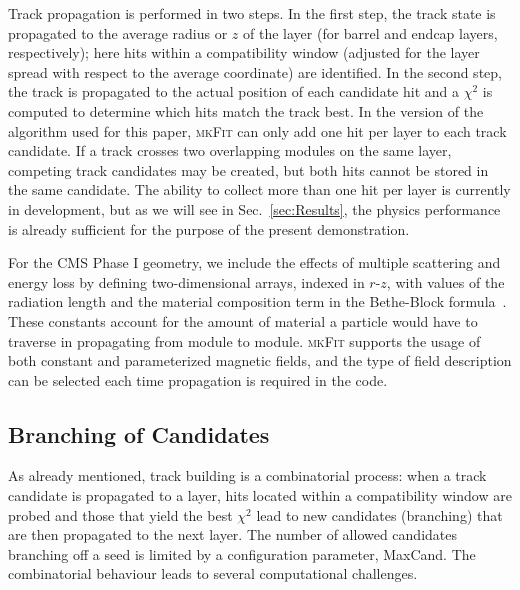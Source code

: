 \documentclass[a4paper,11pt]{article}
\newcommand{\mkFit}{\textsc{mkFit}\xspace}
\begin{document}
Track propagation is performed in two steps. In the first step, the track state is propagated to the average radius or $z$ of the layer (for barrel and endcap layers, respectively); here hits within a compatibility window (adjusted for the layer spread with respect to the average coordinate) are identified. In the second step, the track is propagated to the actual position of each candidate hit and a $\chi^2$ is computed to determine which hits match the track best. In the version of the algorithm used for this paper, \mkFit can only add one hit per layer to each track candidate. If a track crosses two overlapping modules on the same layer, competing track candidates may be created, but both hits cannot be stored in the same candidate. The ability to collect more than one hit per layer is currently in development, but as we will see in Sec.~\ref{sec:Results}, the physics performance is already sufficient for the purpose of the present demonstration.

For the CMS Phase I geometry, we include the effects of multiple scattering and energy loss by defining two-dimensional arrays, indexed in $r$-$z$, with values of the radiation length and the material composition term in the Bethe-Block formula~\cite{Tanabashi:2018oca,CMS-PAS-TRK-10-003,Sirunyan:2018icq}. These constants account for the amount of material a particle would have to traverse in propagating from module to module. 
\mkFit supports the usage of both constant and parameterized magnetic fields, and the type of field description can be selected each time propagation is required in the code.

\subsection{Branching of Candidates}

As already mentioned, track building is a combinatorial process: when a track candidate is propagated to a layer, hits located within a compatibility window are probed and those that yield the best $\chi^2$ lead to new candidates (branching) that are then propagated to the next layer. The number of allowed candidates branching off a seed is limited by a configuration parameter, MaxCand. The combinatorial behaviour leads to several computational challenges.
\end{document}
